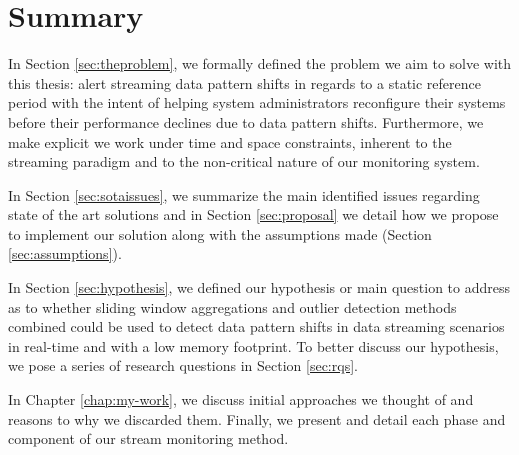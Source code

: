 \section{Summary}
In Section \ref{sec:theproblem}, we formally defined the problem we aim to solve with this thesis: alert streaming data pattern shifts in regards to a static reference period with the intent of helping system administrators reconfigure their systems before their performance declines due to data pattern shifts. Furthermore, we make explicit we work under time and space constraints, inherent to the streaming paradigm and to the non-critical nature of our monitoring system.

In Section \ref{sec:sotaissues}, we summarize the main identified issues regarding state of the art solutions and in Section \ref{sec:proposal} we detail how we propose to implement our solution along with the assumptions made (Section \ref{sec:assumptions}).

In Section \ref{sec:hypothesis}, we defined our hypothesis or main question to address as to whether sliding window aggregations and outlier detection methods combined could be used to detect data pattern shifts in data streaming scenarios in real-time and with a low memory footprint. To better discuss our hypothesis, we pose a series of research questions in Section \ref{sec:rqs}.

In Chapter \ref{chap:my-work}, we discuss initial approaches we thought of and reasons to why we discarded them. Finally, we present and detail each phase and component of our stream monitoring method.
